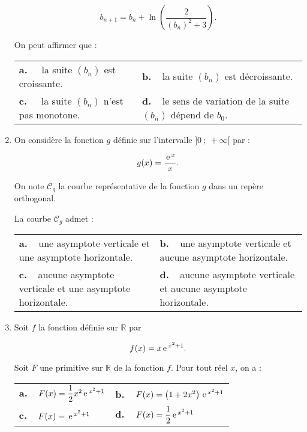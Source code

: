 \documentclass[10pt,a4paper]{article}
\newcommand{\R}{\mathbb{R}}
\newcommand{\e}{\,\text{e\,}}%
\begin{document}
\begin{enumerate}[resume]
\[b_{n+1} = b_n + \ln \left(\dfrac{2}{\left(b_n \right)^2 + 3}\right).\]

On peut affirmer que :

\begin{center}
\begin{tabularx}{\linewidth}{X X}
\textbf{a.~~} la suite $\left(b_n\right)$ est croissante.&\textbf{b.~~}la suite $\left(b_n\right)$ est décroissante.\\
\textbf{c.~~} la suite $\left(b_n\right)$ n'est pas monotone.&\textbf{d.~~}le sens de variation de la suite $\left(b_n\right)$ dépend de $b_0$.
\end{tabularx}
\end{center}

\item On considère la fonction $g$ définie sur l'intervalle $]0~;~+\infty[$ par : 

\[g(x) = \dfrac{\e^x}{x}.\]

On note $\mathcal{C}_g$ la courbe représentative de la fonction $g$ dans un repère orthogonal.

La courbe $\mathcal{C}_g$ admet :

\begin{center}
\begin{tabularx}{\linewidth}{X X}
\textbf{a.~~}une asymptote verticale
et une asymptote horizontale.&\textbf{b.~~}une asymptote verticale
et aucune asymptote horizontale.\\
\textbf{c.~~}aucune asymptote verticale et une asymptote horizontale.&\textbf{d.~~}aucune asymptote verticale et aucune asymptote horizontale.
\end{tabularx}
\end{center}
\item Soit $f$ la fonction définie sur $\R$ par

\[f(x) = x\e^{x^2+1}.\]

Soit $F$ une primitive sur $\R$ de la fonction $f$. Pour tout réel $x$, on a :

\begin{center}
\begin{tabularx}{\linewidth}{X X}
\textbf{a.~~}$F(x) = \dfrac12x^2\e^{x^2+1}$ 	& \textbf{b.~~}$F(x) = \left(1 + 2x^2 \right)\e^{x^2+1}$ \\
\textbf{c.~~}$F(x) = \e^{x^2+1}$				& \textbf{d.~~}$F(x) = \dfrac12\e^{x^2+1}$
\end{tabularx}
\end{center}
\end{enumerate}
\hypertarget{Index}{}
\setlength{\columnsep}{1.5cm}
\printindex
\end{document}
